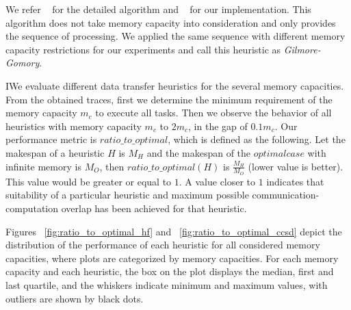 \documentclass[runningheads]{llncs} %
\begin{document}
	We refer ~\cite{Gilmore-Gomory:1964} for the detailed algorithm and ~\cite{gitworkrepo} for our implementation. This algorithm does not take memory capacity into consideration and only provides the sequence of processing. We applied the same sequence with different memory capacity restrictions for our experiments and call this heuristic as \textit{Gilmore-Gomory}.
	
	
	
	IWe evaluate different data transfer heuristics for the several memory capacities. From the obtained traces, first we determine the minimum requirement of the memory capacity $m_c$ to execute all tasks. Then we observe the behavior of all heuristics with memory capacity  $m_c$ to $2m_c$, in the gap of $0.1m_c$. Our performance metric is $ratio\_to\_optimal$, which is defined as the following. Let the makespan of a heuristic $H$ is $M_H$ and the makespan of the $optimal  case$ with infinite memory is $M_O$, then  $ratio\_to\_optimal (H)$ is $\frac{M_H}{M_O}$ (lower value is better). This value would be  greater or equal to $1$. A value closer to $1$ indicates that suitability of a particular heuristic and maximum possible communication-computation overlap has been achieved for that heuristic.
	
	
	Figures ~\ref{fig:ratio_to_optimal_hf} and ~\ref{fig:ratio_to_optimal_ccsd} depict the distribution of the performance  of each heuristic for all considered memory capacities, where plots are categorized by memory capacities. For each memory capacity and each heuristic, the box on the plot displays the median, first and last quartile, and the whiskers indicate minimum and maximum values, with outliers are shown by black dots.
\end{document}
